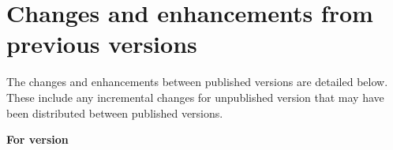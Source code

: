 \section{Changes and enhancements from previous versions}

The changes and enhancements between published versions \SPM are detailed below. These include any incremental changes for unpublished version that may have been distributed between published versions. 

\textbf{For version \SPM\ \VER}


